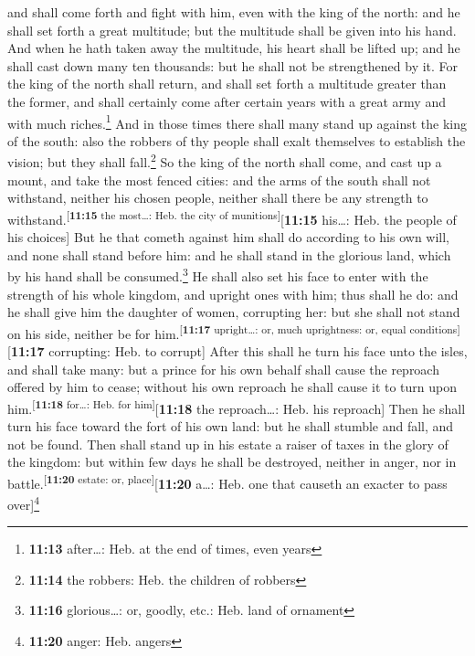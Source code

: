 and shall come forth and fight with him, even with the king of the
north: and he shall set forth a great multitude; but the multitude shall
be given into his hand.  And when he hath taken away the
multitude, his heart shall be lifted up; and he shall cast down many ten
thousands: but he shall not be strengthened by it.  For
the king of the north shall return, and shall set forth a multitude
greater than the former, and shall certainly come after certain years
with a great army and with much riches.\footnote{\textbf{11:13}
  after\ldots: Heb. at the end of times, even years}  And
in those times there shall many stand up against the king of the south:
also the robbers of thy people shall exalt themselves to establish the
vision; but they shall fall.\footnote{\textbf{11:14} the robbers: Heb.
  the children of robbers}  So the king of the north
shall come, and cast up a mount, and take the most fenced cities: and
the arms of the south shall not withstand, neither his chosen people,
neither shall there be any strength to
withstand.\textsuperscript{{[}\textbf{11:15} the most\ldots: Heb. the
city of munitions{]}}{[}\textbf{11:15} his\ldots: Heb. the people of his
choices{]}  But he that cometh against him shall do
according to his own will, and none shall stand before him: and he shall
stand in the glorious land, which by his hand shall be
consumed.\footnote{\textbf{11:16} glorious\ldots: or, goodly, etc.: Heb.
  land of ornament}  He shall also set his face to enter
with the strength of his whole kingdom, and upright ones with him; thus
shall he do: and he shall give him the daughter of women, corrupting
her: but she shall not stand on his side, neither be for
him.\textsuperscript{{[}\textbf{11:17} upright\ldots: or, much
uprightness: or, equal conditions{]}}{[}\textbf{11:17} corrupting: Heb.
to corrupt{]}  After this shall he turn his face unto the
isles, and shall take many: but a prince for his own behalf shall cause
the reproach offered by him to cease; without his own reproach he shall
cause it to turn upon him.\textsuperscript{{[}\textbf{11:18} for\ldots:
Heb. for him{]}}{[}\textbf{11:18} the reproach\ldots: Heb. his
reproach{]}  Then he shall turn his face toward the fort
of his own land: but he shall stumble and fall, and not be found.
 Then shall stand up in his estate a raiser of taxes in
the glory of the kingdom: but within few days he shall be destroyed,
neither in anger, nor in battle.\textsuperscript{{[}\textbf{11:20}
estate: or, place{]}}{[}\textbf{11:20} a\ldots: Heb. one that causeth an
exacter to pass over{]}\footnote{\textbf{11:20} anger: Heb. angers}

